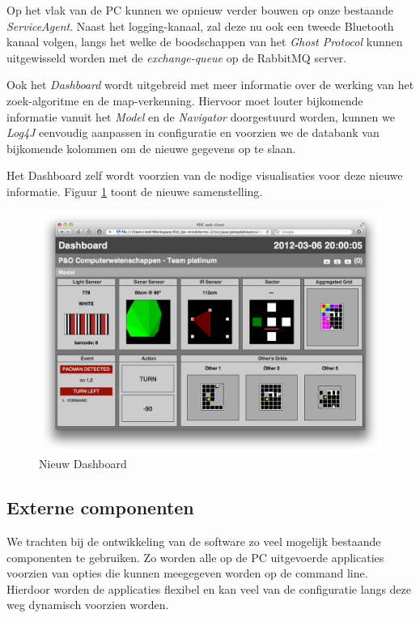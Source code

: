\documentclass[12pt,a4paper]{report}
\begin{document}
Op het vlak van de PC kunnen we opnieuw verder bouwen op onze bestaande \emph{ServiceAgent}. Naast het logging-kanaal, zal deze nu ook een tweede Bluetooth kanaal volgen, langs het welke de boodschappen van het \emph{Ghost Protocol} kunnen uitgewisseld worden met de \emph{exchange-queue} op de RabbitMQ server.

Ook het \emph{Dashboard} wordt uitgebreid met meer informatie over de werking van het zoek-algoritme en de map-verkenning. Hiervoor moet louter bijkomende informatie vanuit het \emph{Model} en de \emph{Navigator} doorgestuurd worden, kunnen we \emph{Log4J} eenvoudig aanpassen in configuratie en voorzien we de databank van bijkomende kolommen om de nieuwe gegevens op te slaan.

Het Dashboard zelf wordt voorzien van de nodige visualisaties voor deze nieuwe informatie. Figuur \ref{fig:dashboard} toont de nieuwe samenstelling.

\begin{figure}[htbp]
  \centering
  \includegraphics[width=155mm]{resources/dashboard.png}
  \caption{Nieuw Dashboard}
  \label{fig:dashboard}
\end{figure}

\subsection{Externe componenten}

We trachten bij de ontwikkeling van de software zo veel mogelijk bestaande componenten te gebruiken. Zo worden alle op de PC uitgevoerde applicaties voorzien van opties die kunnen meegegeven worden op de command line. Hierdoor worden de applicaties flexibel en kan veel van de configuratie langs deze weg dynamisch voorzien worden.
\end{document}
